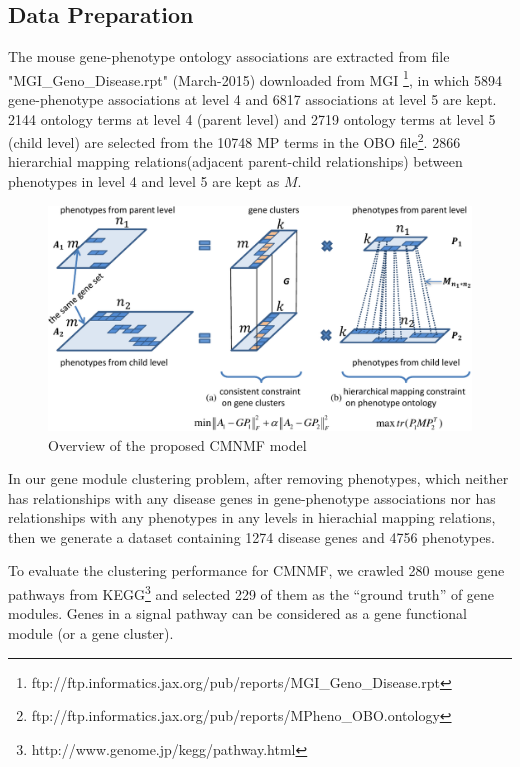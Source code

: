 \documentclass{bmcart}
\begin{document}
\subsection*{\textbf{Data Preparation}}
 The mouse gene-phenotype ontology associations are extracted from file "MGI\_Geno\_Disease.rpt" (March-2015) downloaded from MGI \footnote{ftp://ftp.informatics.jax.org/pub/reports/MGI\_Geno\_Disease.rpt}, in which 5894 gene-phenotype associations at level 4 and 6817 associations at level 5 are kept. 2144 ontology terms at level 4 (parent level) and 2719 ontology terms at level 5 (child level)  are selected from the 10748 MP terms in the OBO file\footnote{ftp://ftp.informatics.jax.org/pub/reports/MPheno\_OBO.ontology}. 2866 hierarchial mapping relations(adjacent parent-child relationships) between phenotypes in level 4 and level 5 are kept as $M$.
\begin{figure}[!t]
  \centering
  \begin{minipage}{.80\linewidth}
  \centering
    \includegraphics[width=\linewidth]{DrawPictures/model.pdf}
  \end{minipage}
  \caption{Overview of the proposed CMNMF model}
  \label{fig:model}
\end{figure}
In our gene module clustering problem,
after removing phenotypes, which neither has relationships with any disease genes in gene-phenotype associations nor has relationships with any phenotypes in any levels in hierachial mapping relations, then we generate a dataset containing 1274 disease genes and 4756 phenotypes.

To evaluate the clustering performance for CMNMF, we crawled 280 mouse gene pathways from KEGG\footnote{http://www.genome.jp/kegg/pathway.html} and selected 229 of them as the ``ground truth'' of gene modules. Genes in a signal pathway can be considered as a gene functional module (or a gene cluster).
\end{document}
